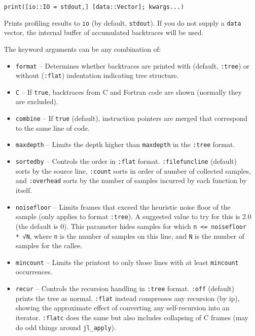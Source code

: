 \begin{adjustwidth}{2em}{0pt}


\begin{verbatim}
print([io::IO = stdout,] [data::Vector]; kwargs...)
\end{verbatim}

Prints profiling results to \texttt{io} (by default, \texttt{stdout}). If you do not supply a \texttt{data} vector, the internal buffer of accumulated backtraces will be used.

The keyword arguments can be any combination of:

\begin{itemize}
\item \texttt{format} – Determines whether backtraces are printed with (default, \texttt{:tree}) or without (\texttt{:flat}) indentation indicating tree structure.


\item \texttt{C} – If \texttt{true}, backtraces from C and Fortran code are shown (normally they are excluded).


\item \texttt{combine} – If \texttt{true} (default), instruction pointers are merged that correspond to the same line of code.


\item \texttt{maxdepth} – Limits the depth higher than \texttt{maxdepth} in the \texttt{:tree} format.


\item \texttt{sortedby} – Controls the order in \texttt{:flat} format. \texttt{:filefuncline} (default) sorts by the source  line, \texttt{:count} sorts in order of number of collected samples, and \texttt{:overhead} sorts by the number of samples  incurred by each function by itself.


\item \texttt{noisefloor} – Limits frames that exceed the heuristic noise floor of the sample (only applies to format \texttt{:tree}).  A suggested value to try for this is 2.0 (the default is 0). This parameter hides samples for which \texttt{n <= noisefloor * √N},  where \texttt{n} is the number of samples on this line, and \texttt{N} is the number of samples for the callee.


\item \texttt{mincount} – Limits the printout to only those lines with at least \texttt{mincount} occurrences.


\item \texttt{recur} – Controls the recursion handling in \texttt{:tree} format. \texttt{:off} (default) prints the tree as normal. \texttt{:flat} instead  compresses any recursion (by ip), showing the approximate effect of converting any self-recursion into an iterator.  \texttt{:flatc} does the same but also includes collapsing of C frames (may do odd things around \texttt{jl\_apply}).


\end{itemize}
\end{adjustwidth}
